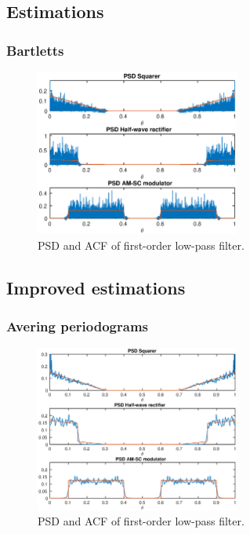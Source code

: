 \documentclass[a4paper,12pt]{article}
\begin{document}

\subsection{Estimations}

\subsubsection{Bartletts}
\begin{figure}[h]
\centering
\includegraphics[width=0.6\textwidth]{bilder/Lab2/Lab2fig7.eps}
\caption{PSD and ACF of first-order low-pass filter.}
\label{fig:Lab1fig1}
\end{figure}


\subsection{Improved estimations}


\subsubsection{Avering periodograms}
\begin{figure}[h]
\centering
\includegraphics[width=0.6\textwidth]{bilder/Lab2/Lab2fig8.eps}
\caption{PSD and ACF of first-order low-pass filter.}
\label{fig:Lab1fig1}
\end{figure}
\end{document}
